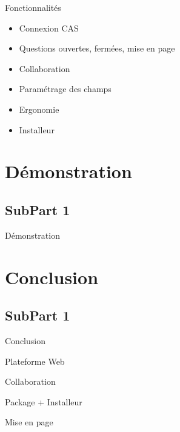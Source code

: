 \documentclass[11pt]{beamer}
\begin{document}
\begin{frame}{Fonctionnalités}
\begin{itemize}
	\item Connexion CAS
	\item Questions ouvertes, fermées, mise en page 
	\item Collaboration
	\item Paramétrage des champs
	\item Ergonomie
	\item Installeur
\end{itemize}
\end{frame}

\section{Démonstration}
\subsection*{SubPart 1}
\begin{frame}{Démonstration}
\end{frame}

\section{Conclusion}
\subsection*{SubPart 1}
\begin{frame}{Conclusion}
\begin{block}{}
	\begin{center}
		Plateforme Web
	\end{center}
\end{block}
	\begin{block}{}
	\begin{center}
		Collaboration
	\end{center}
\end{block}
\begin{block}{}
	\begin{center}
		Package + Installeur
	\end{center}
\end{block}
\begin{block}{}
	\begin{center}
		Mise en page
	\end{center}
\end{block}
\end{frame}
\end{document}
